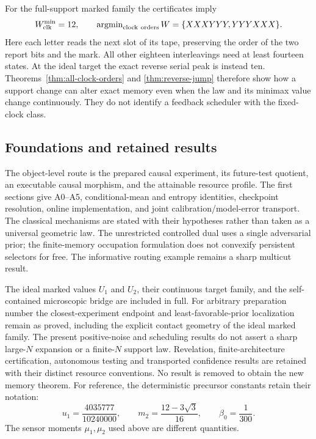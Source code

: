 \documentclass[11pt]{amsart}
\theoremstyle{definition}\newtheorem{definition}[theorem]{Definition}
\theoremstyle{remark}\newtheorem{remark}[theorem]{Remark}
\newcommand{\1}{\mathbf 1}
\begin{document}
For the full-support marked family the certificates imply
\[
  W_{\rm clk}^{\min}=12,
  \qquad \operatorname{argmin}_{\rm clock\ orders}W
                       =\{XXXYYY,YYYXXX\}.
\]
Here each letter reads the next slot of its tape, preserving the order
of the two report bits and the mark. All other eighteen interleavings
need at least fourteen states. At the ideal target the exact reverse
serial peak is instead ten. Theorems~\ref{thm:all-clock-orders} and
\ref{thm:reverse-jump} therefore show how a support change can alter
exact memory even when the law and its minimax value change continuously.
They do not identify a feedback scheduler with the fixed-clock class.

\subsection{Foundations and retained results}
The object-level route is the prepared causal experiment, its
future-test quotient, an executable causal morphism, and the attainable
resource profile. The first sections give A0--A5, conditional-mean and
entropy identities, checkpoint resolution, online implementation, and
joint calibration/model-error transport. The classical mechanisms are
stated with their hypotheses rather than taken as a universal geometric
law. The unrestricted controlled dual uses a single adversarial prior;
the finite-memory occupation formulation does not convexify persistent
selectors for free. The informative routing example remains a sharp
multicut result.

The ideal marked values $U_1$ and $U_2$, their continuous target family,
and the self-contained microscopic bridge are included in full. For
arbitrary preparation number the closest-experiment endpoint and
least-favorable-prior localization remain as proved, including the
explicit contact geometry of the ideal marked family. The present
positive-noise and scheduling results do not assert a sharp large-$N$
expansion or a finite-$N$ support law. Revelation, finite-architecture
certification, autonomous testing and transported confidence results
are retained with their distinct resource conventions. No result is
removed to obtain the new memory theorem.
For reference, the deterministic precursor constants retain their notation:
\begin{equation}\label{eq:constants}
 u_1=\frac{4035777}{10240000},\qquad
 m_2=\frac{12-3\sqrt3}{16},\qquad\beta_0=\frac1{300}.
\end{equation}
The sensor moments $\mu_1,\mu_2$ used above are different quantities.
\end{document}
